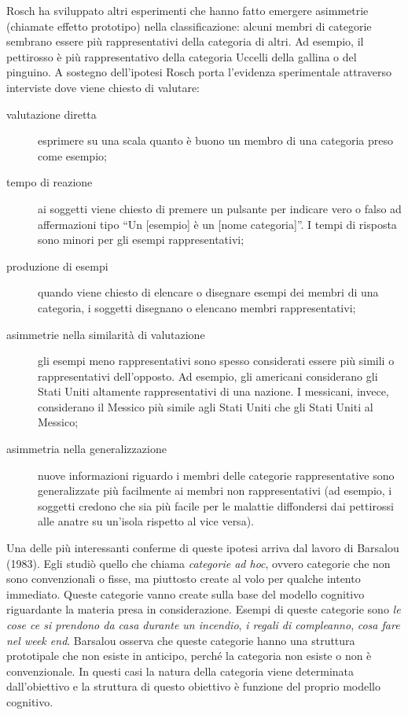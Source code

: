 Rosch ha sviluppato altri esperimenti che hanno fatto emergere asimmetrie (chiamate effetto prototipo) nella classificazione: alcuni membri di categorie sembrano essere più rappresentativi della categoria di altri. Ad esempio, il pettirosso è più rappresentativo della categoria Uccelli della gallina o del pinguino. A sostegno dell’ipotesi Rosch porta l’evidenza sperimentale attraverso interviste dove viene chiesto di valutare:
\begin{description}
  \item[valutazione diretta]esprimere su una scala quanto è buono un membro di una categoria preso come esempio;
  \item[tempo di reazione] ai soggetti viene chiesto di premere un pulsante per indicare vero o falso ad affermazioni tipo ``Un [esempio] è un [nome categoria]''. I tempi di risposta sono minori per gli esempi rappresentativi;
  \item[produzione di esempi] quando viene chiesto di elencare o disegnare esempi dei membri di una categoria, i soggetti disegnano o elencano membri rappresentativi;
  \item[asimmetrie nella similarità di valutazione] gli esempi meno rappresentativi sono spesso considerati essere più simili o rappresentativi dell’opposto. Ad esempio, gli americani considerano gli Stati Uniti altamente rappresentativi di una nazione. I messicani, invece, considerano il Messico più simile agli Stati Uniti che gli Stati Uniti al Messico;
  \item[asimmetria nella generalizzazione] nuove informazioni riguardo i membri delle categorie rappresentative sono generalizzate più facilmente ai membri non rappresentativi (ad esempio, i soggetti credono che sia più facile per le malattie diffondersi dai pettirossi alle anatre su un’isola rispetto al vice versa).
\end{description}

Una delle più interessanti conferme di queste ipotesi arriva dal lavoro di Barsalou (1983). Egli studiò quello che chiama \emph{categorie ad hoc}, ovvero categorie che non sono convenzionali o fisse, ma piuttosto create al volo per qualche intento immediato. Queste categorie vanno create sulla base del modello cognitivo riguardante la materia presa in considerazione. Esempi di queste categorie sono \emph{le cose ce si prendono da casa durante un incendio}, \emph{i regali di compleanno}, \emph{cosa fare nel week end}. Barsalou osserva che queste categorie hanno una struttura prototipale che non esiste in anticipo, perché la categoria non esiste o non è convenzionale. In questi casi la natura della categoria viene determinata dall’obiettivo e la struttura di questo obiettivo è funzione del proprio modello cognitivo.

